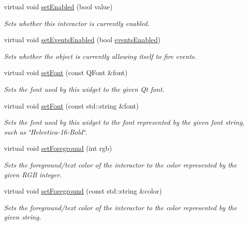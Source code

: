 \begin{DoxyCompactItemize}
virtual void \mbox{\hyperlink{classGInteractor_ab831367dd84bbd579e02e55bacb21343}{set\+Enabled}} (bool value)
\begin{DoxyCompactList}\small\item\em Sets whether this interactor is currently enabled. \end{DoxyCompactList}\item 
virtual void \mbox{\hyperlink{classGObservable_afaa30b2a9e0f378fd1c70d2f1d0b8216}{set\+Events\+Enabled}} (bool \mbox{\hyperlink{classGInteractor_ac05ba5b92e2e5146d416fe7f842a0969}{events\+Enabled}})
\begin{DoxyCompactList}\small\item\em Sets whether the object is currently allowing itself to fire events. \end{DoxyCompactList}\item 
virtual void \mbox{\hyperlink{classGInteractor_a2592348886ffea646c6534bf88f7c49d}{set\+Font}} (const Q\+Font \&font)
\begin{DoxyCompactList}\small\item\em Sets the font used by this widget to the given Qt font. \end{DoxyCompactList}\item 
virtual void \mbox{\hyperlink{classGInteractor_a8e096e8818d838aceae1d46d58fb3a7b}{set\+Font}} (const std\+::string \&font)
\begin{DoxyCompactList}\small\item\em Sets the font used by this widget to the font represented by the given font string, such as \char`\"{}\+Helvetica-\/16-\/\+Bold\char`\"{}. \end{DoxyCompactList}\item 
virtual void \mbox{\hyperlink{classGInteractor_a9eb856b5ff83a19df3831a31f15f4563}{set\+Foreground}} (int rgb)
\begin{DoxyCompactList}\small\item\em Sets the foreground/text color of the interactor to the color represented by the given R\+GB integer. \end{DoxyCompactList}\item 
virtual void \mbox{\hyperlink{classGInteractor_af59209aeadea6dfc6d97a2d8531f50e1}{set\+Foreground}} (const std\+::string \&color)
\begin{DoxyCompactList}\small\item\em Sets the foreground/text color of the interactor to the color represented by the given string. \end{DoxyCompactList}\item 

\end{DoxyCompactItemize}
